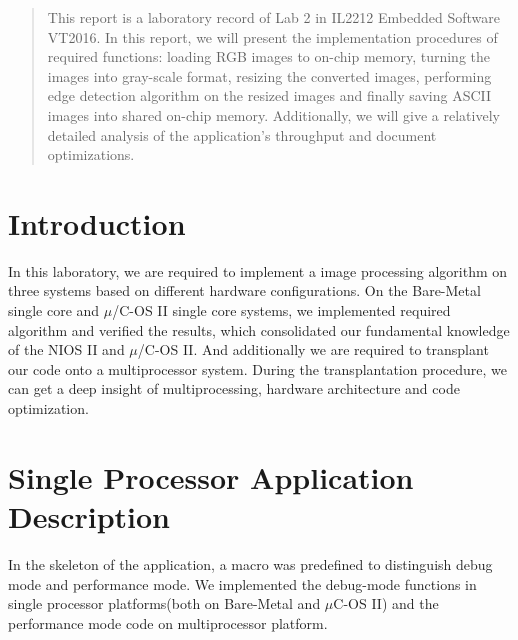 \documentclass[conference]{IEEEtran}
\begin{document}




\maketitle

\begin{abstract}
This report is a laboratory record of Lab 2 in IL2212 Embedded Software VT2016. In this report, we will present the implementation procedures of required functions: loading RGB images to on-chip memory, turning the images into gray-scale format, resizing the converted images, performing edge detection algorithm on the resized images and finally saving ASCII images into shared on-chip memory. Additionally, we will give a relatively detailed analysis of the application's throughput and document optimizations. 
\end{abstract}





%
\IEEEpeerreviewmaketitle



\section{Introduction}
In this laboratory, we are required to implement a image processing algorithm on three systems based on different hardware configurations. On the Bare-Metal single core and $\mu$/C-OS II single core systems, we implemented required algorithm and verified the results, which consolidated our fundamental knowledge of the NIOS II and $\mu$/C-OS II. And additionally we are required to transplant our code onto a multiprocessor system. During the transplantation procedure, we can get a deep insight of multiprocessing, hardware architecture and code optimization. 

\section{Single Processor Application Description}
In the skeleton of the application, a macro was predefined to distinguish debug mode and performance mode. We implemented the debug-mode functions in single processor platforms(both on Bare-Metal and $\mu$C-OS II) and the performance mode code on multiprocessor platform.\\
\end{document}
